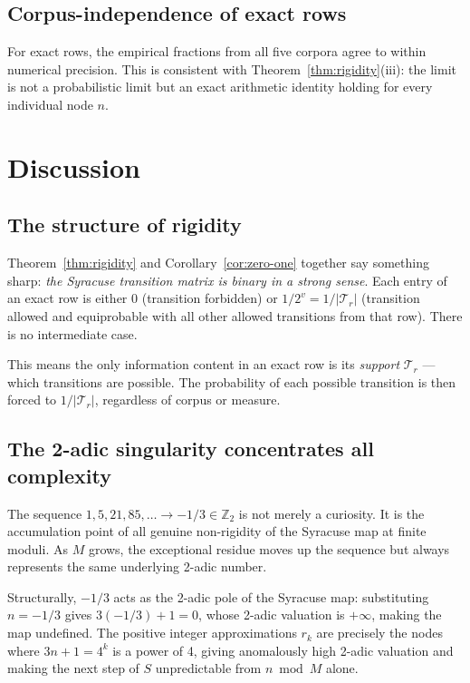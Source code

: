 \documentclass[12pt,a4paper]{article}
\newcommand{\Ztwo}{\mathbb{Z}_2}
\begin{document}
\subsection{Corpus-independence of exact rows}

For exact rows, the empirical fractions from all five corpora agree to within
numerical precision.  This is consistent with Theorem~\ref{thm:rigidity}(iii):
the limit is not a probabilistic limit but an exact arithmetic identity holding
for every individual node $n$.

\section{Discussion}
\label{sec:discussion}

\subsection{The structure of rigidity}

Theorem~\ref{thm:rigidity} and Corollary~\ref{cor:zero-one} together say
something sharp: \emph{the Syracuse transition matrix is binary in a strong
sense}.  Each entry of an exact row is either 0 (transition forbidden) or
$1/2^v = 1/|\mathcal{T}_r|$ (transition allowed and equiprobable with all
other allowed transitions from that row).  There is no intermediate case.

This means the only information content in an exact row is its \emph{support}
$\mathcal{T}_r$ — which transitions are possible.  The probability of each
possible transition is then forced to $1/|\mathcal{T}_r|$, regardless of
corpus or measure.

\subsection{The 2-adic singularity concentrates all complexity}

The sequence $1, 5, 21, 85, \ldots \to -1/3 \in \Ztwo$ is not merely a
curiosity.  It is the accumulation point of all genuine non-rigidity of the
Syracuse map at finite moduli.  As $M$ grows, the exceptional residue moves up
the sequence but always represents the same underlying 2-adic number.

Structurally, $-1/3$ acts as the 2-adic pole of the Syracuse map: substituting
$n = -1/3$ gives $3(-1/3)+1 = 0$, whose 2-adic valuation is $+\infty$, making
the map undefined.  The positive integer approximations $r_k$ are precisely the
nodes where $3n+1 = 4^k$ is a power of 4, giving anomalously high 2-adic
valuation and making the next step of $S$ unpredictable from $n \bmod M$ alone.
\end{document}
